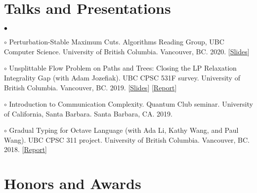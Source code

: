 \documentclass[margin,line]{res}
\newenvironment{list2}{
  \begin{list}{$\bullet$}{%
      \setlength{\itemsep}{0in}
      \setlength{\parsep}{0in} \setlength{\parskip}{0in}
      \setlength{\topsep}{0in} \setlength{\partopsep}{0in}
      \setlength{\leftmargin}{0.2in}}}{\end{list}}
\begin{document}
\begin{resume}
\section{\sc Talks and Presentations}

\begin{list2}
\item[$\circ$] Perturbation-Stable Maximum Cuts. Algorithms Reading Group, UBC Computer Science. University of British Columbia. Vancouver, BC. 2020. [\href{http://ypan.me/docs/maxcut.pdf}{Slides}]
\item[$\circ$] Unsplittable Flow Problem on Paths and Trees: Closing the LP Relaxation Integrality Gap (with Adam Jozefiak). UBC CPSC 531F survey. University of British Columbia. Vancouver, BC. 2019. [\href{http://ypan.me/docs/ufp-slides.pdf}{Slides}] [\href{http://ypan.me/docs/ufp-report.pdf}{Report}]
\item[$\circ$] Introduction to Communication Complexity. Quantum Club seminar. University of California, Santa Barbara. Santa Barbara, CA. 2019.
\item[$\circ$] Gradual Typing for Octave Language (with Ada Li, Kathy Wang, and Paul Wang). UBC CPSC 311 project. University of British Columbia. Vancouver, BC. 2018. [\href{http://ypan.me/docs/gradual-octave.pdf}{Report}]
\end{list2}


\section{\sc Honors and Awards}


\end{resume}
\end{document}
